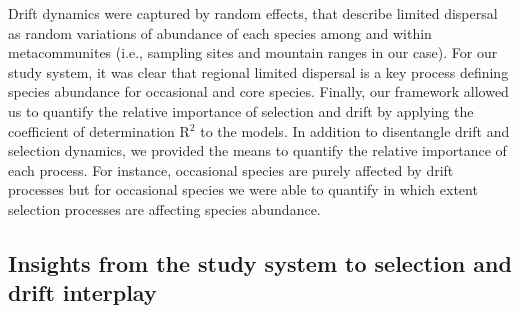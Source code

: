 \documentclass[12pt]{article}
\begin{document}
Drift dynamics were captured by random effects, that describe limited dispersal as random variations of abundance of each species
among and within metacommunites (i.e., sampling sites and mountain ranges in our case). For our study system, it was clear that regional limited dispersal is a key process defining species abundance for occasional and core species. Finally, our framework allowed us to quantify the relative importance of selection and drift by applying the coefficient of determination R{$^2$} \citep{Nakagawa2013, Nakagawa2017} to the models. In addition to disentangle drift and selection dynamics, we provided the means to quantify the relative importance of each process. For instance, occasional species are purely affected by drift processes but for occasional species we were able to quantify in which extent selection processes are affecting species abundance. %


\subsection*{Insights from the study system to selection and drift interplay}
\end{document}
